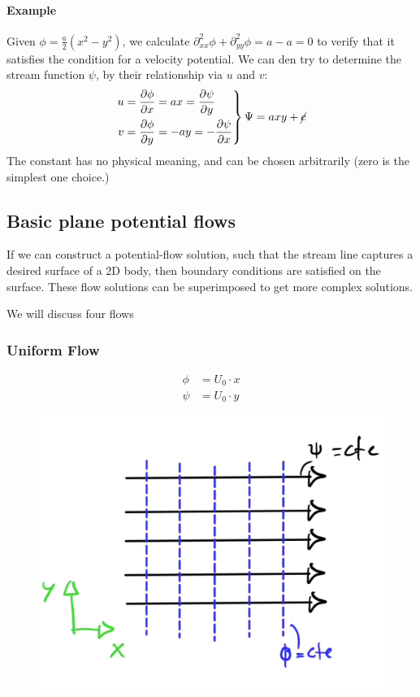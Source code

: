 \paragraph{Example}
Given $\phi = \frac a2 (x^2-y^2)$, we calculate $\partial^2_{xx}\phi + \partial^2_{yy}\phi = a-a = 0$ to verify that it satisfies the condition for a velocity potential. We can den try to determine the stream function $\psi$, by their relationship via $u$ and $v$:
\begin{equation*}
	\left.\begin{split}
		u &= \frac{\partial \phi}{\partial x} = ax = \frac{\partial \psi}{\partial y}\\
		v &= \frac{\partial \phi}{\partial y} = -ay = -\frac{\partial \psi}{\partial x}
	\end{split}\right\} \Psi = axy + \cancel c
\end{equation*}
The constant has no physical meaning, and can be chosen arbitrarily (zero is the simplest one choice.)




\subsection{Basic plane potential flows}
If we can construct a potential-flow solution, such that the stream line captures a desired surface of a 2D body, then boundary conditions are satisfied on the surface. These flow solutions can be superimposed to get more complex solutions.

We will discuss four flows
\subsubsection{Uniform Flow}
\begin{equation*}
	\begin{split}
		\phi &= U_0\cdot x\\
		\psi &= U_0\cdot y
	\end{split}
\end{equation*}
\begin{figure}[H]
	\centering
	\includegraphics[width=0.4\linewidth]{Sketches/uniform_flow}
	\caption{}
	\label{fig:uniformflow}
\end{figure}

